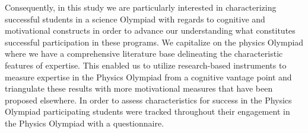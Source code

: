 \documentclass[D:/studies/WinnerS/Erhebungen/IPhO1718/paper/problem_solving/main/TaylorFrancis/interactapasample]{subfiles}
\begin{document}
Consequently, in this study we are particularly interested in characterizing successful students in a science Olympiad with regards to cognitive and motivational constructs in order to advance our understanding what constitutes successful participation in these programs. We capitalize on the physics Olympiad where we have a comprehensive literature base delineating the characteristic features of expertise. This enabled us to utilize research-based instruments to measure expertise in the Physics Olympiad from a cognitive vantage point and triangulate these results with more motivational measures that have been proposed elsewhere. In order to assess characteristics for success in the Physics Olympiad participating students were tracked throughout their engagement in the Physics Olympiad with a questionnaire. 
\end{document}
